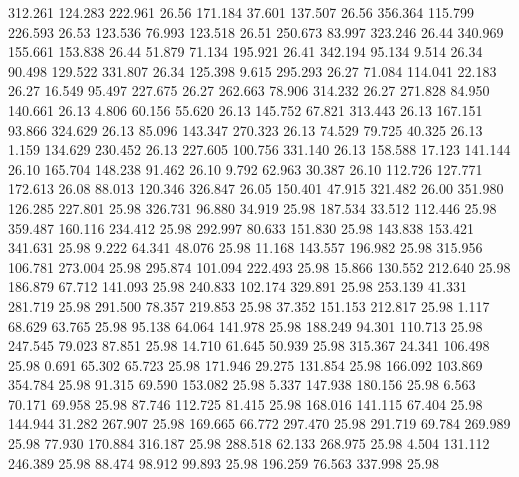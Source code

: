  312.261  124.283  222.961        26.56
 171.184   37.601  137.507        26.56
 356.364  115.799  226.593        26.53
 123.536   76.993  123.518        26.51
 250.673   83.997  323.246        26.44
 340.969  155.661  153.838        26.44
  51.879   71.134  195.921        26.41
 342.194   95.134    9.514        26.34
  90.498  129.522  331.807        26.34
 125.398    9.615  295.293        26.27
  71.084  114.041   22.183        26.27
  16.549   95.497  227.675        26.27
 262.663   78.906  314.232        26.27
 271.828   84.950  140.661        26.13
   4.806   60.156   55.620        26.13
 145.752   67.821  313.443        26.13
 167.151   93.866  324.629        26.13
  85.096  143.347  270.323        26.13
  74.529   79.725   40.325        26.13
   1.159  134.629  230.452        26.13
 227.605  100.756  331.140        26.13
 158.588   17.123  141.144        26.10
 165.704  148.238   91.462        26.10
   9.792   62.963   30.387        26.10
 112.726  127.771  172.613        26.08
  88.013  120.346  326.847        26.05
 150.401   47.915  321.482        26.00
 351.980  126.285  227.801        25.98
 326.731   96.880   34.919        25.98
 187.534   33.512  112.446        25.98
 359.487  160.116  234.412        25.98
 292.997   80.633  151.830        25.98
 143.838  153.421  341.631        25.98
   9.222   64.341   48.076        25.98
  11.168  143.557  196.982        25.98
 315.956  106.781  273.004        25.98
 295.874  101.094  222.493        25.98
  15.866  130.552  212.640        25.98
 186.879   67.712  141.093        25.98
 240.833  102.174  329.891        25.98
 253.139   41.331  281.719        25.98
 291.500   78.357  219.853        25.98
  37.352  151.153  212.817        25.98
   1.117   68.629   63.765        25.98
  95.138   64.064  141.978        25.98
 188.249   94.301  110.713        25.98
 247.545   79.023   87.851        25.98
  14.710   61.645   50.939        25.98
 315.367   24.341  106.498        25.98
   0.691   65.302   65.723        25.98
 171.946   29.275  131.854        25.98
 166.092  103.869  354.784        25.98
  91.315   69.590  153.082        25.98
   5.337  147.938  180.156        25.98
   6.563   70.171   69.958        25.98
  87.746  112.725   81.415        25.98
 168.016  141.115   67.404        25.98
 144.944   31.282  267.907        25.98
 169.665   66.772  297.470        25.98
 291.719   69.784  269.989        25.98
  77.930  170.884  316.187        25.98
 288.518   62.133  268.975        25.98
   4.504  131.112  246.389        25.98
  88.474   98.912   99.893        25.98
 196.259   76.563  337.998        25.98
